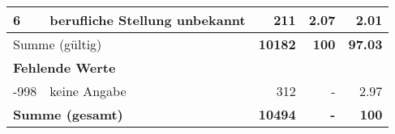 \begin{longtable}{lXrrr}
     6 &
     \multicolumn{1}{X}{ berufliche Stellung unbekannt   } &


       \num{211} &
       \num[round-mode=places,round-precision=2]{2.07} &
         \num[round-mode=places,round-precision=2]{2.01} \\
     \midrule
     \multicolumn{2}{l}{Summe (gültig)} &
       \textbf{\num{10182}} &
     \textbf{\num{100}} &
       \textbf{\num[round-mode=places,round-precision=2]{97.03}} \\
     \multicolumn{5}{l}{\textbf{Fehlende Werte}}\\
       -998 &
       keine Angabe &
         \num{312} &
        - &
         \num[round-mode=places,round-precision=2]{2.97} \\
     \midrule
     \multicolumn{2}{l}{\textbf{Summe (gesamt)}} &
          \textbf{\num{10494}} &
        \textbf{-} &
        \textbf{\num{100}} \\
     \bottomrule
     \end{longtable}
     
